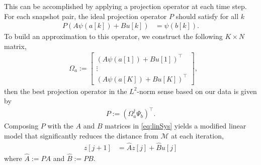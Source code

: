 This can be accomplished by applying a projection operator at each time step.
For each snapshot pair, the ideal projection operator $P$ should satisfy for all $k$
\begin{align}
    P \left( A {\psi}(a[k]) + B u[k] \right) &= \psi(b[k]).
\end{align}
To build an approximation to this operator, we construct the following $K \times N$ matrix,
\begin{align}
    &\Omega_a := \begin{bmatrix} \left( A {\psi}(a[1]) + B u[1] \right)^\top \\ \vdots \\  \left( A {\psi}(a[K]) + B u[K] \right)^\top \end{bmatrix},
    \label{eq:Omega}
\end{align}
then the best projection operator in the $L^2$-norm sense based on our data is given by
\begin{align}
    P := \left( \Omega_{a}^\dagger \Psi_b \right)^\top.
    \label{eq:P}
\end{align}
Composing $P$ with the $A$ and $B$ matrices in \eqref{eq:linSys} yields a modified linear model that significantly reduces the distance from $\mathcal{M}$ at each iteration,
\begin{align}
    z[j+1] &= \hat{A} z[j] + \hat{B} u[j]
    \label{eq:linSys_wP}
\end{align}
where $\hat{A} := PA$ and  $\hat{B} := PB$.

